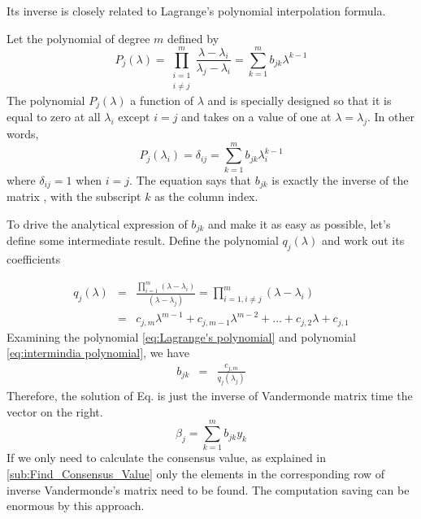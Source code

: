 Its inverse is closely related to Lagrange's polynomial interpolation
formula. 

Let the polynomial of degree $m$ defined by 
\begin{equation}
P_{j}\left(\lambda\right)=\prod_{\begin{array}{c}
i=1\\
i\neq j
\end{array}}^{m}\frac{\lambda-\lambda_{i}}{\lambda_{j}-\lambda_{i}}=\sum_{k=1}^{m}b_{jk}\lambda^{k-1}\label{eq:Lagrange's polynomial}
\end{equation}
The polynomial $P_{j}\left(\lambda\right)$ a function of $\lambda$
and is specially designed so that it is equal to zero at all $\lambda_{i}$
except $i=j$ and takes on a value of one at $\lambda=\lambda_{j}$.
In other words, 
\[
P_{j}\left(\lambda_{i}\right)=\delta_{ij}=\sum_{k=1}^{m}b_{jk}\lambda_{i}^{k-1}
\]
where $\delta_{ij}=1$ when $i=j$. The equation says that $b_{jk}$
is exactly the inverse of the matrix ,
with the subscript $k$ as the column index. 

To drive the analytical expression of $b_{jk}$ and make it as easy
as possible, let's define some intermediate result. Define the polynomial
$q_{j}\left(\lambda\right)$ and work out its coefficients

\begin{eqnarray}
q_{j}\left(\lambda\right) & = & \frac{\prod_{i=1}^{m}\left(\lambda-\lambda_{i}\right)}{\left(\lambda-\lambda_{j}\right)}=\prod_{i=1,i\neq j}^{m}\left(\lambda-\lambda_{i}\right)\label{eq:intermindia polynomial}\\
 & = & c_{j,m}\lambda^{m-1}+c_{j,m-1}\lambda^{m-2}+\ldots+c_{j,2}\lambda+c_{j,1}\nonumber 
\end{eqnarray}
Examining the polynomial \ref{eq:Lagrange's polynomial} and polynomial
\ref{eq:intermindia polynomial}, we have 
\begin{eqnarray*}
b_{jk} & = & \frac{c_{j,m}}{q_{j}\left(\lambda_{j}\right)}
\end{eqnarray*}
Therefore, the solution of Eq. is just the inverse
of Vandermonde matrix time the vector on the right. 
\[
\beta_{j}=\sum_{k=1}^{m}b_{jk}y_{k}
\]
If we only need to calculate the consensus value, as explained in
\ref{sub:Find_Consensus_Value} only the elements in the corresponding
row of inverse Vandermonde's matrix need to be found. The computation
saving can be enormous by this approach.
